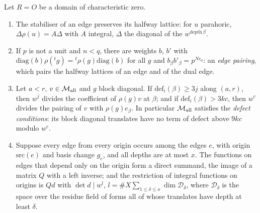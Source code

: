 \begin{proposition}[Edges]\label{prop:edges}
Let $R=O$ be a domain of characteristic zero.
\begin{enumerate}[label=\textup{(\alph*)}]
\item The stabiliser of an edge preserves its halfway lattice: for $u$ parahoric, $\Delta\rho(u)=A\Delta$ with $A$ integral, $\Delta$ the diagonal of the
$w^{\mathrm{depth}\,\beta}$.
\item If $p$ is not a unit and $n<q$, there are weights $b$, $b'$ with $\mathrm{diag}(b)\rho({}^tg)={}^t\rho(g)\mathrm{diag}(b)$ for all $g$ and $b_\beta b'_\beta=p^{Nc_0}$:
an \emph{edge pairing}, which pairs the halfway lattices of an edge and of the dual edge.
\item Let $a<r$, $v\in\mathcal M_{\rm all}$ and $g$ block diagonal. If $\mathrm{def}_i(\beta)\ge3j$ along $(a,r)$, then $w^j$ divides the coefficient of $\rho(g)v$ at $\beta$;
and if $\mathrm{def}_i(\beta)>3kc$, then $w^c$ divides the pairing of $v$ with $\rho(g)e_\beta$. In particular $\mathcal M_{\rm all}$ satisfies the \emph{defect conditions}:
its block diagonal translates have no term of defect above $9kc$ modulo $w^c$.
\item Suppose every edge from every origin occurs among the edges $e$, with origin $\mathrm{src}(e)$ and basis change $g_e$, and all depths are at most $x$.
The functions on edges that depend only on the origin form a direct summand, the image of a matrix $Q$ with a left inverse; and the restriction
of integral functions on origins is $Qd$ with $\det d\mid w^{l}$, $l=\#X\sum_{1\le\delta\le x}\dim\mathcal D_\delta$, where $\mathcal D_\delta$ is the space over the
residue field of forms all of whose translates have depth at least $\delta$.
\end{enumerate}
\end{proposition}

